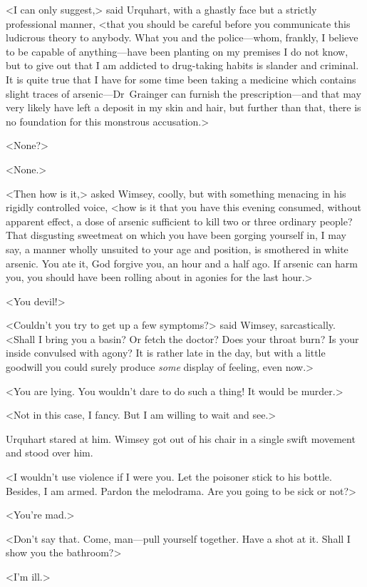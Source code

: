 <I can only suggest,> said Urquhart, with a ghastly face but a strictly professional manner, <that you should be careful before you communicate this ludicrous theory to anybody. What you and the police—whom, frankly, I believe to be capable of anything—have been planting on my premises I do not know, but to give out that I am addicted to drug-taking habits is slander and criminal. It is quite true that I have for some time been taking a medicine which contains slight traces of arsenic—Dr~Grainger can furnish the prescription—and that may very likely have left a deposit in my skin and hair, but further than that, there is no foundation for this monstrous accusation.>

<None?>

<None.>

<Then how is it,> asked Wimsey, coolly, but with something menacing in his rigidly controlled voice, <how is it that you have this evening consumed, without apparent effect, a dose of arsenic sufficient to kill two or three ordinary people? That disgusting sweetmeat on which you have been gorging yourself in, I may say, a manner wholly unsuited to your age and position, is smothered in white arsenic. You ate it, God forgive you, an hour and a half ago. If arsenic can harm you, you should have been rolling about in agonies for the last hour.>

<You devil!>

<Couldn't you try to get up a few symptoms?> said Wimsey, sarcastically. <Shall I bring you a basin? Or fetch the doctor? Does your throat burn? Is your inside convulsed with agony? It is rather late in the day, but with a little goodwill you could surely produce \emph{some} display of feeling, even now.>

<You are lying. You wouldn't dare to do such a thing! It would be murder.>

<Not in this case, I fancy. But I am willing to wait and see.>

Urquhart stared at him. Wimsey got out of his chair in a single swift movement and stood over him.

<I wouldn't use violence if I were you. Let the poisoner stick to his bottle. Besides, I am armed. Pardon the melodrama. Are you going to be sick or not?>

<You're mad.>

<Don't say that. Come, man—pull yourself together. Have a shot at it. Shall I show you the bathroom?>

<I'm ill.>

